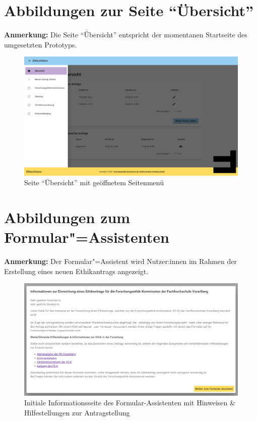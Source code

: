 \documentclass[a4paper,12pt,twoside,numbers=noendperiod]{scrreprt}
\begin{document}
\newpage

\section{Abbildungen zur Seite \enquote{Übersicht}}

\textbf{Anmerkung:} Die Seite \enquote{Übersicht} entspricht der momentanen Startseite des umgesetzten Prototyps.

\begin{figure}[ht]
    \centering
    \includegraphics[width=\linewidth]{thesis/images/Luidold_EthicsVision-Übersicht_Menü.png}
    \caption{Seite \enquote{Übersicht} mit geöffnetem Seitenmenü}
    \label{fig:ethics-vision-übersicht-menü}
\end{figure}

\newpage

\section{Abbildungen zum Formular"=Assistenten}
\label{appendix:ethics-vision-formular-assistent}

\textbf{Anmerkung:} Der Formular"=Assistent wird Nutzer:innen im Rahmen der Erstellung eines neuen Ethikantrags angezeigt.

\begin{figure}[htp!]
    \centering
    \includegraphics[width=\linewidth]{thesis/images/Luidold_EthicsVision-Formular-Assistent_Welcome-Screen.png}
    \caption{Initiale Informationsseite des Formular-Assistenten mit Hinweisen \& Hilfestellungen zur Antragstellung}
    \label{fig:ethics-vision-formular-assistent-welcome-screen}
\end{figure}
\end{document}
